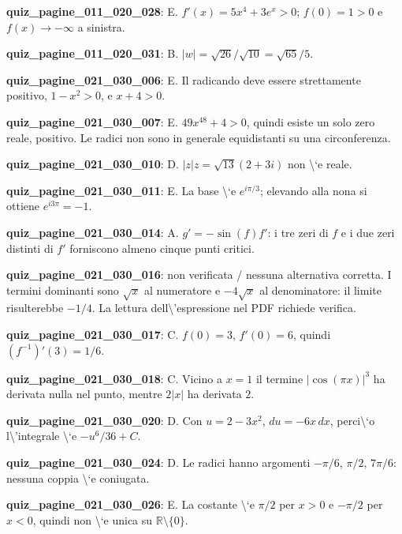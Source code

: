 \documentclass[11pt,a4paper]{article}
\newcounter{quiz}
\begin{document}
\noindent\textbf{quiz\_pagine\_011\_020\_028}: E. $f\prime(x)=5x^4+3e^x>0$; $f(0)=1>0$ e $f(x)\to-\infty$ a sinistra.\par\medskip
\noindent\textbf{quiz\_pagine\_011\_020\_031}: B. $|w|=\sqrt{26}/\sqrt{10}=\sqrt{65}/5$.\par\medskip
\noindent\textbf{quiz\_pagine\_021\_030\_006}: E. Il radicando deve essere strettamente positivo, $1-x^2>0$, e $x+4>0$.\par\medskip
\noindent\textbf{quiz\_pagine\_021\_030\_007}: E. $49x^{48}+4>0$, quindi esiste un solo zero reale, positivo. Le radici non sono in generale equidistanti su una circonferenza.\par\medskip
\noindent\textbf{quiz\_pagine\_021\_030\_010}: D. $|z|z=\sqrt{13}(2+3i)$ non \textbackslash{}`e reale.\par\medskip
\noindent\textbf{quiz\_pagine\_021\_030\_011}: E. La base \textbackslash{}`e $e^{i\pi/3}$; elevando alla nona si ottiene $e^{i3\pi}=-1$.\par\medskip
\noindent\textbf{quiz\_pagine\_021\_030\_014}: A. $g\prime=-\sin(f)f\prime$: i tre zeri di $f$ e i due zeri distinti di $f\prime$ forniscono almeno cinque punti critici.\par\medskip
\noindent\textbf{quiz\_pagine\_021\_030\_016}: non verificata / nessuna alternativa corretta. I termini dominanti sono $\sqrt{x}$ al numeratore e $-4\sqrt{x}$ al denominatore: il limite risulterebbe $-1/4$. La lettura dell\textbackslash{}'espressione nel PDF richiede verifica.\par\medskip
\noindent\textbf{quiz\_pagine\_021\_030\_017}: C. $f(0)=3$, $f\prime(0)=6$, quindi $(f^{-1})\prime(3)=1/6$.\par\medskip
\noindent\textbf{quiz\_pagine\_021\_030\_018}: C. Vicino a $x=1$ il termine $|\cos(\pi x)|^3$ ha derivata nulla nel punto, mentre $2|x|$ ha derivata $2$.\par\medskip
\noindent\textbf{quiz\_pagine\_021\_030\_020}: D. Con $u=2-3x^2$, $du=-6x\,dx$, perci\textbackslash{}`o l\textbackslash{}'integrale \textbackslash{}`e $-u^6/36+C$.\par\medskip
\noindent\textbf{quiz\_pagine\_021\_030\_024}: D. Le radici hanno argomenti $-\pi/6$, $\pi/2$, $7\pi/6$: nessuna coppia \textbackslash{}`e coniugata.\par\medskip
\noindent\textbf{quiz\_pagine\_021\_030\_026}: E. La costante \textbackslash{}`e $\pi/2$ per $x>0$ e $-\pi/2$ per $x<0$, quindi non \textbackslash{}`e unica su $\mathbb R\setminus\{0\}$.\par\medskip
\end{document}
